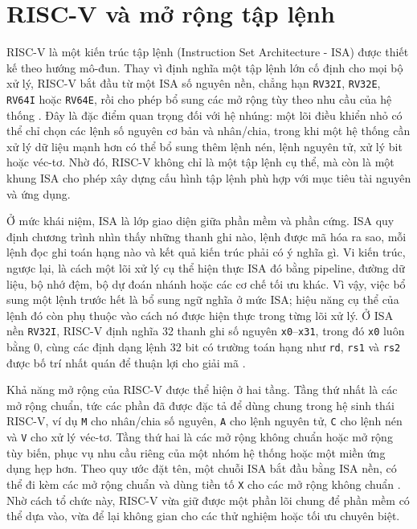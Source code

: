 \documentclass[../DoAn.tex]{subfiles}
\begin{document}
\section{RISC-V và mở rộng tập lệnh}
\label{sec:riscv-mo-rong-tap-lenh}

RISC-V là một kiến trúc tập lệnh (Instruction Set Architecture - ISA) được thiết kế theo hướng mô-đun. Thay vì định nghĩa một tập lệnh lớn cố định cho mọi bộ xử lý, RISC-V bắt đầu từ một ISA số nguyên nền, chẳng hạn \texttt{RV32I}, \texttt{RV32E}, \texttt{RV64I} hoặc \texttt{RV64E}, rồi cho phép bổ sung các mở rộng tùy theo nhu cầu của hệ thống \cite{riscv_unpriv_2026}. Đây là đặc điểm quan trọng đối với hệ nhúng: một lõi điều khiển nhỏ có thể chỉ chọn các lệnh số nguyên cơ bản và nhân/chia, trong khi một hệ thống cần xử lý dữ liệu mạnh hơn có thể bổ sung thêm lệnh nén, lệnh nguyên tử, xử lý bit hoặc véc-tơ. Nhờ đó, RISC-V không chỉ là một tập lệnh cụ thể, mà còn là một khung ISA cho phép xây dựng cấu hình tập lệnh phù hợp với mục tiêu tài nguyên và ứng dụng.

Ở mức khái niệm, ISA là lớp giao diện giữa phần mềm và phần cứng. ISA quy định chương trình nhìn thấy những thanh ghi nào, lệnh được mã hóa ra sao, mỗi lệnh đọc ghi toán hạng nào và kết quả kiến trúc phải có ý nghĩa gì. Vi kiến trúc, ngược lại, là cách một lõi xử lý cụ thể hiện thực ISA đó bằng pipeline, đường dữ liệu, bộ nhớ đệm, bộ dự đoán nhánh hoặc các cơ chế tối ưu khác. Vì vậy, việc bổ sung một lệnh trước hết là bổ sung ngữ nghĩa ở mức ISA; hiệu năng cụ thể của lệnh đó còn phụ thuộc vào cách nó được hiện thực trong từng lõi xử lý. Ở ISA nền \texttt{RV32I}, RISC-V định nghĩa 32 thanh ghi số nguyên \texttt{x0}--\texttt{x31}, trong đó \texttt{x0} luôn bằng 0, cùng các định dạng lệnh 32 bit có trường toán hạng như \texttt{rd}, \texttt{rs1} và \texttt{rs2} được bố trí nhất quán để thuận lợi cho giải mã \cite{riscv_unpriv_2026}.

Khả năng mở rộng của RISC-V được thể hiện ở hai tầng. Tầng thứ nhất là các mở rộng chuẩn, tức các phần đã được đặc tả để dùng chung trong hệ sinh thái RISC-V, ví dụ \texttt{M} cho nhân/chia số nguyên, \texttt{A} cho lệnh nguyên tử, \texttt{C} cho lệnh nén và \texttt{V} cho xử lý véc-tơ. Tầng thứ hai là các mở rộng không chuẩn hoặc mở rộng tùy biến, phục vụ nhu cầu riêng của một nhóm hệ thống hoặc một miền ứng dụng hẹp hơn. Theo quy ước đặt tên, một chuỗi ISA bắt đầu bằng ISA nền, có thể đi kèm các mở rộng chuẩn và dùng tiền tố \texttt{X} cho các mở rộng không chuẩn \cite{riscv_unpriv_2026}. Nhờ cách tổ chức này, RISC-V vừa giữ được một phần lõi chung để phần mềm có thể dựa vào, vừa để lại không gian cho các thử nghiệm hoặc tối ưu chuyên biệt.
\end{document}
